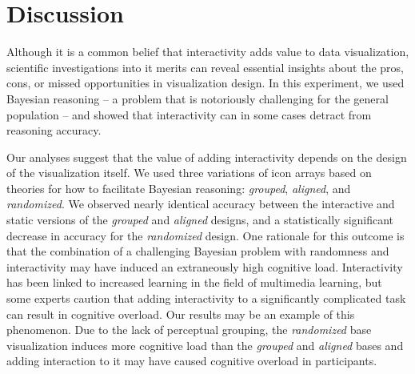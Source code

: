 \section{Discussion} 
Although it is a common belief that interactivity adds value to data visualization, scientific investigations into it merits can reveal essential insights about the pros, cons, or missed opportunities in visualization design. In this experiment, we used Bayesian reasoning -- a problem that is notoriously challenging for the general population -- and showed that interactivity can in some cases detract from reasoning accuracy. 

Our analyses suggest that the value of adding interactivity depends on the design of the visualization itself. We used three variations of icon arrays based on theories for how to facilitate Bayesian reasoning: \textit{grouped}, \textit{aligned}, and \textit{randomized}. We observed nearly identical accuracy between the interactive and static versions of the \textit{grouped} and \textit{aligned} designs, and a statistically significant decrease in accuracy for the \textit{randomized} design. One rationale for this outcome is that the combination of a challenging Bayesian problem with randomness and interactivity may have induced an extraneously high cognitive load. Interactivity has been linked to increased learning in the field of multimedia learning\cite{evans2007Interactivity}, but some experts caution that adding interactivity to a significantly complicated task can result in cognitive overload\cite{mayer2001Cognitive}. Our results may be an example of this phenomenon. Due to the lack of perceptual grouping, the \textit{randomized} base visualization induces more cognitive load than the \textit{grouped} and \textit{aligned} bases and adding interaction to it may have caused cognitive overload in participants.    

